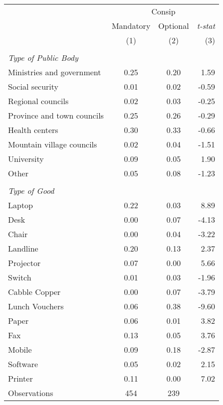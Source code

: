 \begin{tabular}{lccr}
\toprule
& \multicolumn{3}{c}{Consip}  \\
\cmidrule(lr){2-4}
& Mandatory & Optional & \emph{t-stat} \\
& (1) & (2) & (3) \\
\midrule
\\ \textit{Type of Public Body}\\ Ministries and government&0.25&0.20&1.59\\
Social security&0.01&0.02&-0.59\\
Regional councils&0.02&0.03&-0.25\\
Province and town councils&0.25&0.26&-0.29\\
Health centers&0.30&0.33&-0.66\\
Mountain village councils&0.02&0.04&-1.51\\
University&0.09&0.05&1.90\\
Other&0.05&0.08&-1.23\\
\\ \textit{Type of Good}\\ Laptop&0.22&0.03&8.89\\
Desk&0.00&0.07&-4.13\\
Chair&0.00&0.04&-3.22\\
Landline&0.20&0.13&2.37\\
Projector&0.07&0.00&5.66\\
Switch&0.01&0.03&-1.96\\
Cabble Copper&0.00&0.07&-3.79\\
Lunch Vouchers&0.06&0.38&-9.60\\
Paper&0.06&0.01&3.82\\
Fax&0.13&0.05&3.76\\
Mobile&0.09&0.18&-2.87\\
Software&0.05&0.02&2.15\\
Printer&0.11&0.00&7.02\\
\bottomrule
Observations&  454    &  239&   \\
\bottomrule
\end{tabular}
